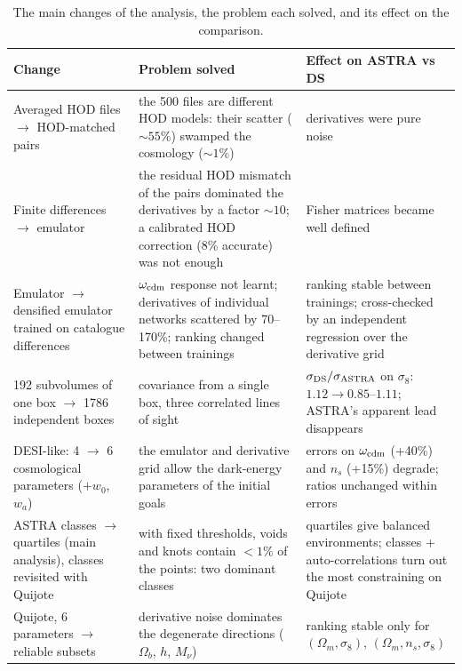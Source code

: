 \documentclass[11pt,twocolumn]{article}
\begin{document}
\begin{table}[!tp]
\centering\small
\begin{tabular}{p{4.2cm}p{6.3cm}p{6.3cm}}
\toprule
Change & Problem solved & Effect on ASTRA vs DS \\
\midrule
Averaged HOD files $\to$ HOD-matched pairs & the 500 files are different HOD models: their scatter ($\sim55\%$) swamped the cosmology ($\sim1\%$) & derivatives were pure noise \\
Finite differences $\to$ emulator & the residual HOD mismatch of the pairs dominated the derivatives by a factor $\sim10$; a calibrated HOD correction (8\% accurate) was not enough & Fisher matrices became well defined \\
Emulator $\to$ densified emulator trained on catalogue differences & $\omega_{\rm cdm}$ response not learnt; derivatives of individual networks scattered by 70--170\%; ranking changed between trainings & ranking stable between trainings; cross-checked by an independent regression over the derivative grid \\
192 subvolumes of one box $\to$ 1786 independent boxes & covariance from a single box, three correlated lines of sight & $\sigma_{\rm DS}/\sigma_{\rm ASTRA}$ on $\sigma_8$: $1.12\to0.85$--$1.11$; ASTRA's apparent lead disappears \\
DESI-like: 4 $\to$ 6 cosmological parameters ($+w_0$, $w_a$) & the emulator and derivative grid allow the dark-energy parameters of the initial goals & errors on $\omega_{\rm cdm}$ (+40\%) and $n_s$ (+15\%) degrade; ratios unchanged within errors \\
ASTRA classes $\to$ quartiles (main analysis), classes revisited with Quijote & with fixed thresholds, voids and knots contain $<1\%$ of the points: two dominant classes & quartiles give balanced environments; classes + auto-correlations turn out the most constraining on Quijote \\
Quijote, 6 parameters $\to$ reliable subsets & derivative noise dominates the degenerate directions ($\Omega_b$, $h$, $M_\nu$) & ranking stable only for $(\Omega_m,\sigma_8)$, $(\Omega_m,n_s,\sigma_8)$ \\
\bottomrule
\end{tabular}
\caption{The main changes of the analysis, the problem each solved, and its effect on the comparison.}
\label{tab:evolution}
\end{table}
\end{document}
